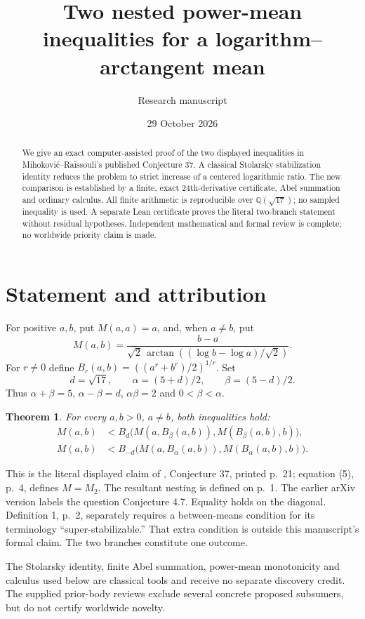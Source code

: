\documentclass[11pt]{article}
\title{Two nested power-mean inequalities for a logarithm--arctangent mean}
\author{Research manuscript}
\date{29 October 2026}
\newtheorem{theorem}{Theorem}
\newcommand{\atan}{\operatorname{arctan}}
\begin{document}
\maketitle
\begin{abstract}
We give an exact computer-assisted proof of the two displayed inequalities in Mihokovi\'c--Ra\"issouli's published Conjecture 37. A classical Stolarsky stabilization identity reduces the problem to strict increase of a centered logarithmic ratio. The new comparison is established by a finite, exact 24th-derivative certificate, Abel summation and ordinary calculus. All finite arithmetic is reproducible over $\mathbb Q(\sqrt {17})$; no sampled inequality is used. A separate Lean certificate proves the literal two-branch statement without residual hypotheses. Independent mathematical and formal review is complete; no worldwide priority claim is made.
\end{abstract}
\section{Statement and attribution}
For positive $a,b$, put $M(a,a)=a$, and, when $a\ne b$, put
\[
 M(a,b)=\frac{b-a}{\sqrt2\,\atan((\log b-\log a)/\sqrt2)}.
\]
For $r\ne0$ define $B_r(a,b)=((a^r+b^r)/2)^{1/r}$. Set
\[
 d=\sqrt {17},\qquad \alpha=(5+d)/2,\qquad \beta=(5-d)/2.
\]
Thus $\alpha+\beta=5$, $\alpha-\beta=d$, $\alpha\beta=2$ and $0<\beta<\alpha$.
\begin{theorem}\label{main}
For every $a,b>0$, $a\ne b$, both inequalities hold:
\begin{align*}
M(a,b)&<B_d\bigl(M(a,B_\beta(a,b)),M(B_\beta(a,b),b)\bigr),\\
M(a,b)&<B_{-d}\bigl(M(a,B_\alpha(a,b)),M(B_\alpha(a,b),b)\bigr).
\end{align*}
\end{theorem}
This is the literal displayed claim of \cite{MR}, Conjecture 37, printed p.~21; equation (5), p.~4, defines $M=M_2$. The resultant nesting is defined on p.~1. The earlier arXiv version labels the question Conjecture 4.7. Equality holds on the diagonal. Definition 1, p.~2, separately requires a between-means condition for its terminology ``super-stabilizable.'' That extra condition is outside this manuscript's formal claim. The two branches constitute one outcome.

The Stolarsky identity, finite Abel summation, power-mean monotonicity and calculus used below are classical tools and receive no separate discovery credit. The supplied prior-body reviews exclude several concrete proposed subsumers, but do not certify worldwide novelty.
\newpage
\end{document}
